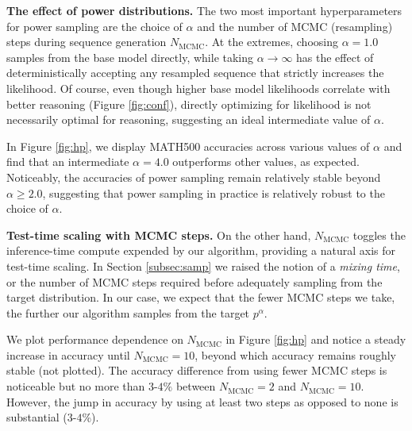 \documentclass{article}
\renewcommand{\paragraph}[1]{\vspace{.1em}\noindent\textbf{#1}}
\begin{document}
\paragraph{The effect of power distributions.}
The two most important hyperparameters for power sampling are the choice of $\alpha$ and the number of MCMC (resampling) steps during sequence generation $N_{\text{MCMC}}$. At the extremes, choosing $\alpha = 1.0$ samples from the base model directly, while taking $\alpha \to \infty$ has the effect of deterministically accepting any resampled sequence that strictly increases the likelihood. Of course, even though higher base model likelihoods correlate with better reasoning (Figure \ref{fig:conf}), directly optimizing for likelihood is not necessarily optimal for reasoning, suggesting an ideal intermediate value of $\alpha$.

In Figure \ref{fig:hp}, we display MATH500 accuracies across various values of $\alpha$ and find that an intermediate $\alpha = 4.0$ outperforms other values, as expected. Noticeably, the accuracies of power sampling remain relatively stable beyond $\alpha \geq 2.0$, suggesting that power sampling in practice is relatively robust to the choice of $\alpha$.


\paragraph{Test-time scaling with MCMC steps.} On the other hand, $N_{\text{MCMC}}$ toggles the inference-time compute expended by our algorithm, providing a natural axis for test-time scaling. In Section \ref{subsec:samp} we raised the notion of a \textit{mixing time}, or the number of MCMC steps required before adequately sampling from the target distribution. In our case, we expect that the fewer MCMC steps we take, the further our algorithm samples from the target $p^{\alpha}$. 



We plot performance dependence on $N_{\text{MCMC}}$ in Figure \ref{fig:hp} and notice a steady increase in accuracy until $N_{\text{MCMC}} = 10$, beyond which accuracy remains roughly stable (not plotted). The accuracy difference from using fewer MCMC steps is noticeable but no more than $3$-$4\%$ between $N_{\text{MCMC}} = 2$
and $N_{\text{MCMC}} = 10$. However, the jump in accuracy by using at least two steps as opposed to none is substantial ($3$-$4$\%). 
\end{document}
